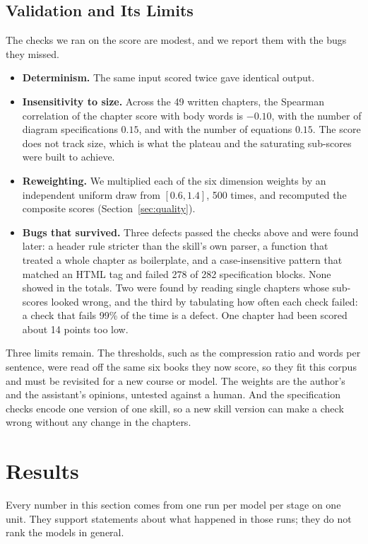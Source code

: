 \documentclass[11pt]{article}
\begin{document}
\subsection{Validation and Its Limits}

The checks we ran on the score are modest, and we report them with the bugs they missed.

\begin{itemize}
\item \textbf{Determinism.} The same input scored twice gave identical output.
\item \textbf{Insensitivity to size.} Across the 49 written chapters, the Spearman correlation of the chapter score with body words is $-0.10$, with the number of diagram specifications $0.15$, and with the number of equations $0.15$. The score does not track size, which is what the plateau and the saturating sub-scores were built to achieve.
\item \textbf{Reweighting.} We multiplied each of the six dimension weights by an independent uniform draw from $[0.6,1.4]$, 500 times, and recomputed the composite scores (Section~\ref{sec:quality}).
\item \textbf{Bugs that survived.} Three defects passed the checks above and were found later: a header rule stricter than the skill's own parser, a function that treated a whole chapter as boilerplate, and a case-insensitive pattern that matched an HTML tag and failed 278 of 282 specification blocks. None showed in the totals. Two were found by reading single chapters whose sub-scores looked wrong, and the third by tabulating how often each check failed: a check that fails 99\% of the time is a defect. One chapter had been scored about 14 points too low.
\end{itemize}

Three limits remain. The thresholds, such as the compression ratio and words per sentence, were read off the same six books they now score, so they fit this corpus and must be revisited for a new course or model. The weights are the author's and the assistant's opinions, untested against a human. And the specification checks encode one version of one skill, so a new skill version can make a check wrong without any change in the chapters.

\section{Results}
\label{sec:results}

Every number in this section comes from one run per model per stage on one unit. They support statements about what happened in those runs; they do not rank the models in general.
\end{document}
